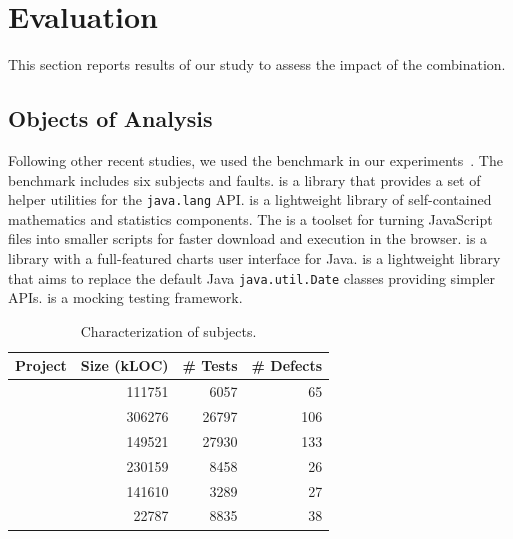 \documentclass[sigplan,10pt,review,anonymous]{acmart}\settopmatter{printfolios=true,printccs=false,printacmref=false}
\begin{document}
\section{Evaluation}
\label{sec:eval}


This section reports results of our study to assess the impact of the
\comb{} combination.

\subsection{Objects of Analysis}

Following other recent studies, we used the \dfj{} benchmark in our
experiments~\cite{just-defects4j-issta2014}. The \dfj{} benchmark
includes six subjects and \numFaults{} faults.
\lang{} is a library
that provides a set of helper utilities for the {\small\texttt{java.lang}}
API. \cmath{} is a lightweight library of self-contained
mathematics and statistics components. The \closure{} is a toolset for
turning JavaScript files into smaller scripts for faster
download and execution in the browser. \chart{} is a library with a
full-featured charts user interface for Java. \jtime{} is a
lightweight library that aims to replace the default Java
{\small\texttt{java.util.Date}} classes providing simpler APIs. \mockito{} is
a mocking testing framework.

\newcommand{\cgray}[1]{\cellcolor{gray!25}#1}
\begin{table}[h]
  \centering
  \setlength{\tabcolsep}{4pt}
    \begin{tabular}{lrrr}
      \toprule
      Project            & Size (kLOC) & \# Tests & \# Defects \\ %
      \midrule
      \lang{}            & 111751  & 6057 & 65       \\   %
      \cmath{}           & 306276  & 26797 & 106     \\   %
      \closure{}         & 149521  & 27930  & 133     \\   %
      \chart{}           & 230159  & 8458 & 26      \\  %
      \jtime{}           & 141610  & 3289 & 27       \\   %
      \mockito{}         & 22787  & 8835 & 38    \\     %
      \bottomrule
  \end{tabular}
\caption {Characterization of \dfj{} subjects.}
\end{table}
\normalsize
\end{document}
